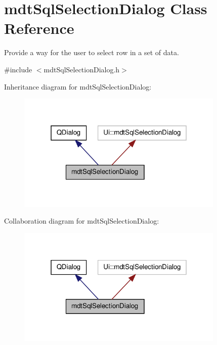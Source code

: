 \hypertarget{classmdt_sql_selection_dialog}{\section{mdt\-Sql\-Selection\-Dialog Class Reference}
\label{classmdt_sql_selection_dialog}
}


Provide a way for the user to select row in a set of data.  




{\ttfamily \#include $<$mdt\-Sql\-Selection\-Dialog.\-h$>$}



Inheritance diagram for mdt\-Sql\-Selection\-Dialog\-:\nopagebreak
\begin{figure}[H]
\begin{center}
\leavevmode
\includegraphics[width=280pt]{classmdt_sql_selection_dialog__inherit__graph}
\end{center}
\end{figure}


Collaboration diagram for mdt\-Sql\-Selection\-Dialog\-:\nopagebreak
\begin{figure}[H]
\begin{center}
\leavevmode
\includegraphics[width=280pt]{classmdt_sql_selection_dialog__coll__graph}
\end{center}
\end{figure}
